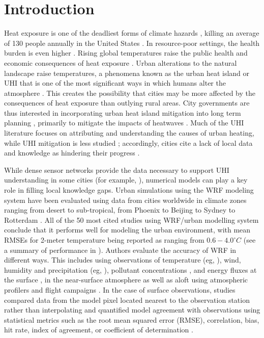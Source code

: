 \documentclass[draft,linenumbers]{agujournal}
\begin{document}
\section{Introduction}\label{sec:intro}
Heat exposure is one of the deadliest forms of climate hazards \cite{wmo}, killing an average of 130 people annually in the United States \citep{usnh_stat}. In resource-poor settings, the health burden is even higher \citep{wmo}. Rising global temperatures raise the public health and economic consequences of heat exposure \citep{ipcc}. Urban alterations to the natural landscape raise temperatures, a phenomena known as the urban heat island or UHI that is one of the most significant ways in which humans alter the atmosphere \citep{kalnay2003impact}. This creates the possibility that cities may be more affected by the consequences of heat exposure than outlying rural areas. 
City governments are thus interested in incorporating urban heat island mitigation into long term planning \citep{shickman2016current}, primarily to mitigate the impacts of heatwaves \citep{hewitt2014cool}. Much of the UHI literature focuses on attributing and understanding the causes of urban heating, while UHI mitigation is less studied \citep{huang2018urban}; accordingly, cities cite a lack of local data and knowledge as hindering their progress \citep{hewitt2014cool}. %
 
While dense sensor networks provide the data necessary to support UHI understanding in some cities (for example, \cite{scott2017intraurban,scott2017temperature,madisonUHI,minneapolisUHI,tokyoUHI}), numerical models can play a key role in filling local knowledge gaps. Urban simulations using the WRF modeling system \citep{chen2011integrated} have been evaluated using data from cities worldwide in climate zones ranging from desert to sub-tropical, from Phoenix \citep{georgescu2013summer} to Beijing \citep{wang2013modeling} to Sydney \citep{argueso2014temperature} to Rotterdam \citep{theeuwes2014seasonal}. All of the 50 most cited studies using WRF/urban modelling system conclude that it performs well for modeling the urban environment, with mean RMSEs for 2-meter temperature being reported as ranging from $0.6-4.0^\circ C$ (see a summary of performance in \cite{kim2013evaluation}).
Authors evaluate the accuracy of WRF in different ways. This includes using observations of temperature (eg, \citet{kusaka2012numerical}), wind, humidity and precipitation (eg, \cite{miao2011impacts,chen2011numerical}), pollutant concentrations \citep{brioude2013top}, and energy fluxes at the surface \citep{yang2015enhancing,loridan2012multi}, in the near-surface atmosphere as well as aloft using atmospheric profilers and flight campaigns \citep{li2013development}. In the case of surface observations, studies compared data from the model pixel located nearest to the observation station rather than interpolating and quantified model agreement with observations using statistical metrics such as the root mean squared error (RMSE), correlation, bias, hit rate, index of agreement, or coefficient of determination \citep{loridan2010trade,salamanca2011study,lee2011evaluation,chen2011numerical,chen2014wrf,li2013multi}.
\end{document}
